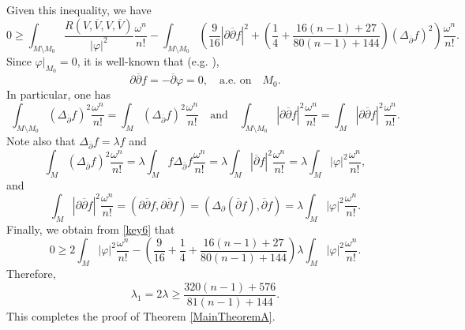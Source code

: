 \documentclass[12pt, reqno]{amsart}
\newcommand\bp{{\bar\partial}}
\theoremstyle{plain}
\theoremstyle{definition}
\newcommand{\p}{\partial}
\renewcommand{\bar}{\overline}
\renewcommand{\phi}{\varphi}
\newcommand{\beq}{\begin{equation}}
\newcommand{\eeq}{\end{equation}}
\newcommand{\qtq}[1]{\quad\mbox{#1}\quad}
\renewcommand{\bp}{\bar{\partial}}
\renewcommand{\>}{\rightarrow}
\renewcommand{\#}{\sharp}
\numberwithin{equation}{section} %
\begin{document}
Given this inequality, we have
\beq 0 \geq \int_{M\setminus M_0} \frac{R(V,\bar V,V,\bar V)}{|\phi|^2} \frac{\omega^n}{n!}-\int_{M\setminus M_0} \left(\frac{9}{16}|\p\bp f|^2 +\left(\frac{1}{4}+\frac{16(n-1)+27}{80(n-1)+144}\right)(\Delta_{\bp} f)^2\right)\frac{\omega^n}{n!}.\label{key6} \eeq 
Since  $\phi|_{M_0}=0$,   it is well-known that  (e.g. \cite[p.~310]{Eva2010}),  \beq \p\bp f=-\bp\phi=0, \qtq{a.e. on}M_0. \eeq
In particular, one has
\beq \int_{M\setminus M_0} (\Delta_{\bar\p} f)^2\frac{\omega^n}{n!} =\int_{M} (\Delta_{\bar\p} f)^2\frac{\omega^n}{n!} \qtq{and} \int_{M\setminus M_0} |\p\bar\p f|^2\frac{\omega^n}{n!}=\int_{M} |\p\bar\p f|^2\frac{\omega^n}{n!}.  \eeq
Note also that $\Delta_{\bp } f=\lambda f$ and
\beq \int_{M} (\Delta_{\bar\p} f)^2\frac{\omega^n}{n!} = \lambda\int_M f\Delta_{\bar\p} f \frac{\omega^n}{n!} =\lambda \int_M |\bp f|^2 \frac{\omega^n}{n!}=\lambda \int_M |\phi|^2 \frac{\omega^n}{n!},\eeq
and
\beq \int_{M} |\p\bar\p f|^2\frac{\omega^n}{n!}=(\p\bp f, \p\bp f)=(\Delta_{\p} (\bp f), \bp f)=\lambda \int_M |\phi|^2 \frac{\omega^n}{n!}.  \eeq
Finally, we obtain from \eqref{key6} that
\beq 0\geq  2\int_M |\phi|^2 \frac{\omega^n}{n!} -\left(\frac{9}{16}+\frac{1}{4}+\frac{16(n-1)+27}{80(n-1)+144}\right)\lambda \int_M |\phi|^2 \frac{\omega^n}{n!}.\eeq
Therefore, 
\beq \lambda_1=2\lambda \geq \frac{320(n-1)+576}{81(n-1)+144}.\eeq
This completes the proof of Theorem \ref{MainTheoremA}.\\
\end{document}

